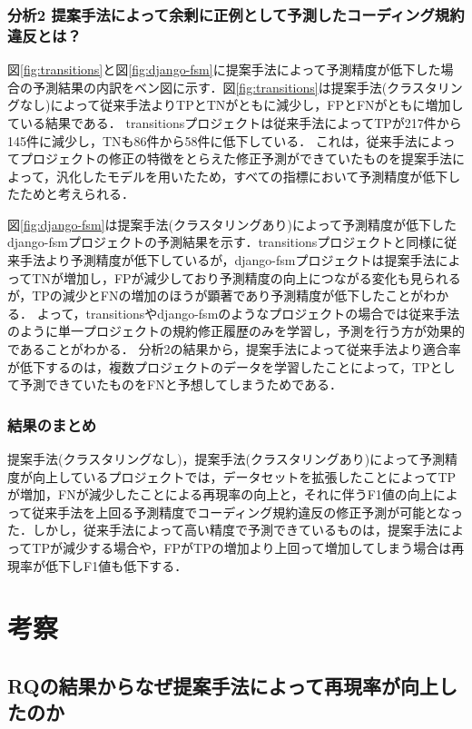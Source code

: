 \documentclass[submit,noauthor,dvipdfmx]{ipsj}
\begin{document}
\subsubsection*{分析2 提案手法によって余剰に正例として予測したコーディング規約違反とは？}

図\ref{fig:transitions}と図\ref{fig:django-fsm}に提案手法によって予測精度が低下した場合の予測結果の内訳をベン図に示す．図\ref{fig:transitions}は提案手法(クラスタリングなし)によって従来手法よりTPとTNがともに減少し，FPとFNがともに増加している結果である．
transitionsプロジェクトは従来手法によってTPが217件から145件に減少し，TNも86件から58件に低下している．
これは，従来手法によってプロジェクトの修正の特徴をとらえた修正予測ができていたものを提案手法によって，汎化したモデルを用いたため，すべての指標において予測精度が低下したためと考えられる．

図\ref{fig:django-fsm}は提案手法(クラスタリングあり)によって予測精度が低下したdjango-fsmプロジェクトの予測結果を示す．transitionsプロジェクトと同様に従来手法より予測精度が低下しているが，django-fsmプロジェクトは提案手法によってTNが増加し，FPが減少しており予測精度の向上につながる変化も見られるが，TPの減少とFNの増加のほうが顕著であり予測精度が低下したことがわかる．
よって，transitionsやdjango-fsmのようなプロジェクトの場合では従来手法のように単一プロジェクトの規約修正履歴のみを学習し，予測を行う方が効果的であることがわかる．
分析2の結果から，提案手法によって従来手法より適合率が低下するのは，複数プロジェクトのデータを学習したことによって，TPとして予測できていたものをFNと予想してしまうためである．

\subsubsection{結果のまとめ}

提案手法(クラスタリングなし)，提案手法(クラスタリングあり)によって予測精度が向上しているプロジェクトでは，データセットを拡張したことによってTPが増加，FNが減少したことによる再現率の向上と，それに伴うF1値の向上によって従来手法を上回る予測精度でコーディング規約違反の修正予測が可能となった．しかし，従来手法によって高い精度で予測できているものは，提案手法によってTPが減少する場合や，FPがTPの増加より上回って増加してしまう場合は再現率が低下しF1値も低下する．

\section{考察}\label{chap:consideration}

\subsection{RQの結果からなぜ提案手法によって再現率が向上したのか}\label{kosatu}
\end{document}
